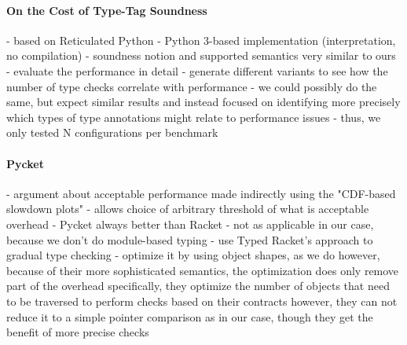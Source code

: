 \paragraph{On the Cost of Type-Tag Soundness}
\begin{cnote}
- based on Reticulated Python
  - Python 3-based implementation (interpretation, no compilation)
- soundness notion and supported semantics very similar to ours
- evaluate the performance in detail
 - generate different variants to see how the number of type checks correlate
   with performance
 - we could possibly do the same, but expect similar results and instead
   focused on identifying more precisely which types of type annotations
   might relate to performance issues
   - thus, we only tested N configurations per benchmark
\end{cnote}

\paragraph{Pycket}
\begin{cnote}
- argument about acceptable performance made indirectly
  using the "CDF-based slowdown plots"
  - allows choice of arbitrary threshold of what is acceptable overhead
    - Pycket always better than Racket
    - not as applicable in our case, because we don't do module-based typing
  - use Typed Racket's approach to gradual type checking
  - optimize it by using object shapes, as we do
    however, because of their more sophisticated semantics,
    the optimization does only remove part of the overhead
    specifically, they optimize the number of objects that need to be traversed
    to perform checks based on their contracts
    however, they can not reduce it to a simple pointer comparison as in our
    case, though they get the benefit of more precise checks
\end{cnote}
